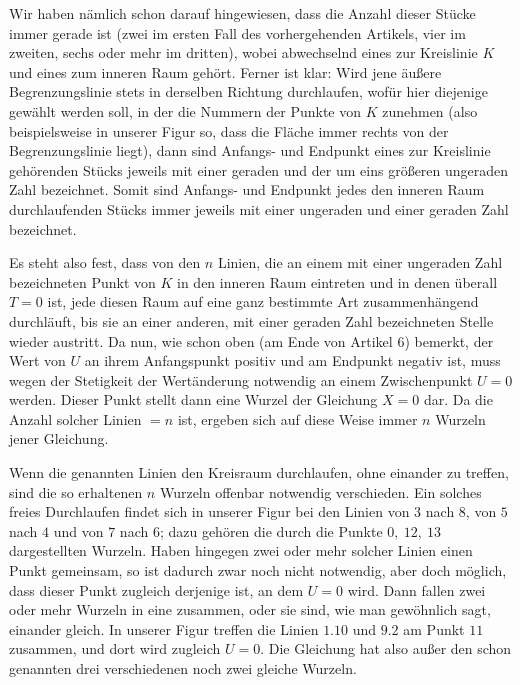 Wir haben nämlich schon darauf hingewiesen, dass die Anzahl dieser Stücke immer gerade ist (zwei im ersten Fall des vorhergehenden Artikels, vier im zweiten, sechs oder mehr im dritten), wobei abwechselnd eines zur Kreislinie $K$ und eines zum inneren Raum gehört. Ferner ist klar: Wird jene äußere Begrenzungslinie stets in derselben Richtung durchlaufen, wofür hier diejenige gewählt werden soll, in der die Nummern der Punkte von $K$ zunehmen (also beispielsweise in unserer Figur so, dass die Fläche immer rechts von der Begrenzungslinie liegt), dann sind Anfangs- und Endpunkt eines zur Kreislinie gehörenden Stücks jeweils mit einer geraden und der um eins größeren ungeraden Zahl bezeichnet. Somit sind Anfangs- und Endpunkt jedes den inneren Raum durchlaufenden Stücks immer jeweils mit einer ungeraden und einer geraden Zahl bezeichnet.

Es steht also fest, dass von den $n$ Linien, die an einem mit einer ungeraden Zahl bezeichneten Punkt von $K$ in den inneren Raum eintreten und in denen überall $T=0$ ist, jede diesen Raum auf eine ganz bestimmte Art zusammenhängend durchläuft, bis sie an einer anderen, mit einer geraden Zahl bezeichneten Stelle wieder austritt. Da nun, wie schon oben (am Ende von Artikel 6) bemerkt, der Wert von $U$ an ihrem Anfangspunkt positiv und am Endpunkt negativ ist, muss wegen der Stetigkeit der Wertänderung notwendig an einem Zwischenpunkt $U=0$ werden. Dieser Punkt stellt dann eine Wurzel der Gleichung $X=0$ dar. Da die Anzahl solcher Linien $=n$ ist, ergeben sich auf diese Weise immer $n$ Wurzeln jener Gleichung.


Wenn die genannten Linien den Kreisraum durchlaufen, ohne einander zu treffen, sind die so erhaltenen $n$ Wurzeln offenbar notwendig verschieden. Ein solches freies Durchlaufen findet sich in unserer Figur bei den Linien von $3$ nach $8$, von $5$ nach $4$ und von $7$ nach $6$; dazu gehören die durch die Punkte $0,\ 12,\ 13$ dargestellten Wurzeln. Haben hingegen zwei oder mehr solcher Linien einen Punkt gemeinsam, so ist dadurch zwar noch nicht notwendig, aber doch möglich, dass dieser Punkt zugleich derjenige ist, an dem $U=0$ wird. Dann fallen zwei oder mehr Wurzeln in eine zusammen, oder sie sind, wie man gewöhnlich sagt, einander gleich. In unserer Figur treffen die Linien $1.10$ und $9.2$ am Punkt $11$ zusammen, und dort wird zugleich $U=0$. Die Gleichung hat also außer den schon genannten drei verschiedenen noch zwei gleiche Wurzeln.

